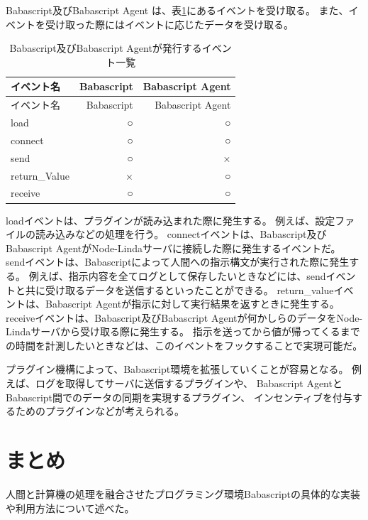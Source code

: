 Babascript及びBabascript Agent
は、表\ref{table:plugin-events}にあるイベントを受け取る。
また、イベントを受け取った際にはイベントに応じたデータを受け取る。

\begin{longtable}[c]{@{}lrr@{}}
\caption{Babascript及びBabascript Agentが発行するイベント一覧
\label{table:plugin-events}}\tabularnewline
\toprule
イベント名 & Babascript & Babascript Agent\tabularnewline
\midrule
\endfirsthead
\toprule
イベント名 & Babascript & Babascript Agent\tabularnewline
\midrule
\endhead
load & ○ & ○\tabularnewline
connect & ○ & ○\tabularnewline
send & ○ & ×\tabularnewline
return\_Value & × & ○\tabularnewline
receive & ○ & ○\tabularnewline
\bottomrule
\end{longtable}

loadイベントは、プラグインが読み込まれた際に発生する。
例えば、設定ファイルの読み込みなどの処理を行う。
connectイベントは、Babascript及びBabascript
AgentがNode-Lindaサーバに接続した際に発生するイベントだ。
sendイベントは、Babascriptによって人間への指示構文が実行された際に発生する。
例えば、指示内容を全てログとして保存したいときなどには、sendイベントと共に受け取るデータを送信するといったことができる。
return\_valueイベントは、Babascript
Agentが指示に対して実行結果を返すときに発生する。
receiveイベントは、Babascript及びBabascript
Agentが何かしらのデータをNode-Lindaサーバから受け取る際に発生する。
指示を送ってから値が帰ってくるまでの時間を計測したいときなどは、このイベントをフックすることで実現可能だ。

プラグイン機構によって、Babascript環境を拡張していくことが容易となる。
例えば、ログを取得してサーバに送信するプラグインや、 Babascript
AgentとBabascript間でのデータの同期を実現するプラグイン、
インセンティブを付与するためのプラグインなどが考えられる。

\section{まとめ}\label{ux307eux3068ux3081}

人間と計算機の処理を融合させたプログラミング環境Babascriptの具体的な実装や利用方法について述べた。
